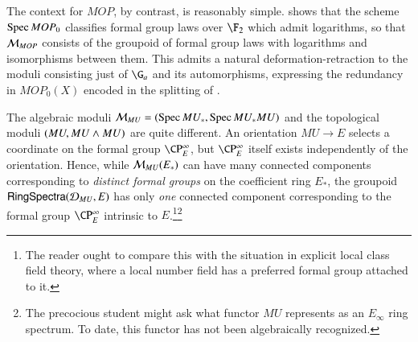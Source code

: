 
\begin{example}\label{ContextOfMOPExample}
The context for $MOP$, by contrast, is reasonably simple.   shows that the scheme $\operatorname{Spec} MOP_0$ classifies formal group laws over $\F_2$ which admit logarithms, so that $\mathcal{M}_{MOP}$ consists of the groupoid of formal group laws with logarithms and isomorphisms between them.  This admits a natural deformation-retraction to the moduli consisting just of $\G_a$ and its automorphisms, expressing the redundancy in $MOP_0(X)$ encoded in the splitting of .
\end{example}

\begin{remark}
The algebraic moduli $\mathcal{M}_{MU} = (\operatorname{Spec} MU_*, \operatorname{Spec} MU_* MU)$ and the topological moduli $(MU, MU \wedge MU)$ are quite different.  An orientation $MU \to E$ selects a coordinate on the formal group $\CP^\infty_E$, but $\CP^\infty_E$ itself exists independently of the orientation.  Hence, while $\mathcal{M}_{MU}(E_*)$ can have many connected components corresponding to \emph{distinct formal groups} on the coefficient ring $E_*$, the groupoid $\mathsf{RingSpectra}(\mathcal{D}_{MU}, E)$ has only \emph{one} connected component corresponding to the formal group $\CP^\infty_E$ intrinsic to $E$.\footnote{The reader ought to compare this with the situation in explicit local class field theory, where a local number field has a preferred formal group attached to it.}\footnote{The precocious student might ask what functor $MU$ represents as an $E_\infty$ ring spectrum.  To date, this functor has not been algebraically recognized.}
\end{remark}

